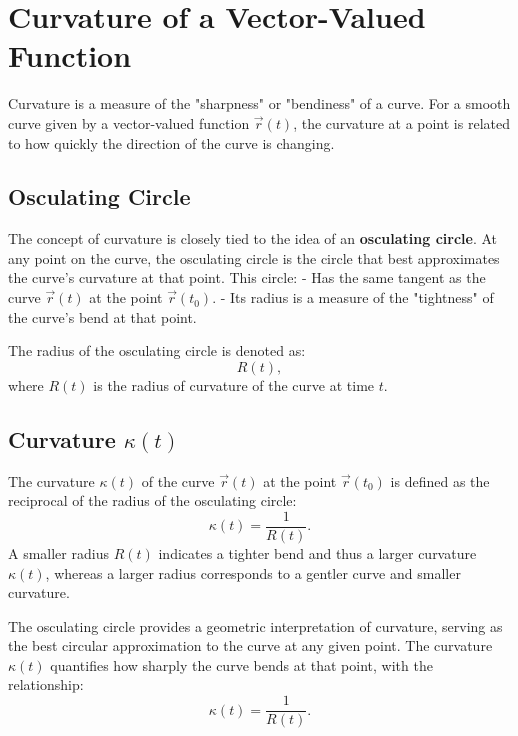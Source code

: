 \documentclass{report}
\begin{document}
\section{Curvature of a Vector-Valued Function}
Curvature is a measure of the "sharpness" or "bendiness" of a curve. For a smooth curve given by a vector-valued function \(\vec{r}(t)\), the curvature at a point is related to how quickly the direction of the curve is changing.

\subsection{Osculating Circle}
The concept of curvature is closely tied to the idea of an \textbf{osculating circle}. At any point on the curve, the osculating circle is the circle that best approximates the curve's curvature at that point. This circle:
- Has the same tangent as the curve \(\vec{r}(t)\) at the point \(\vec{r}(t_0)\).
- Its radius is a measure of the "tightness" of the curve's bend at that point.

The radius of the osculating circle is denoted as:
\[
	R(t),
\]
where \(R(t)\) is the radius of curvature of the curve at time \(t\).

\subsection{Curvature \(\kappa(t)\)}
The curvature \(\kappa(t)\) of the curve \(\vec{r}(t)\) at the point \(\vec{r}(t_0)\) is defined as the reciprocal of the radius of the osculating circle:
\[
	\kappa(t) = \frac{1}{R(t)}.
\]
A smaller radius \(R(t)\) indicates a tighter bend and thus a larger curvature \(\kappa(t)\), whereas a larger radius corresponds to a gentler curve and smaller curvature.

The osculating circle provides a geometric interpretation of curvature, serving as the best circular approximation to the curve at any given point. The curvature \(\kappa(t)\) quantifies how sharply the curve bends at that point, with the relationship:
\[
	\kappa(t) = \frac{1}{R(t)}.
\]

\end{document}
